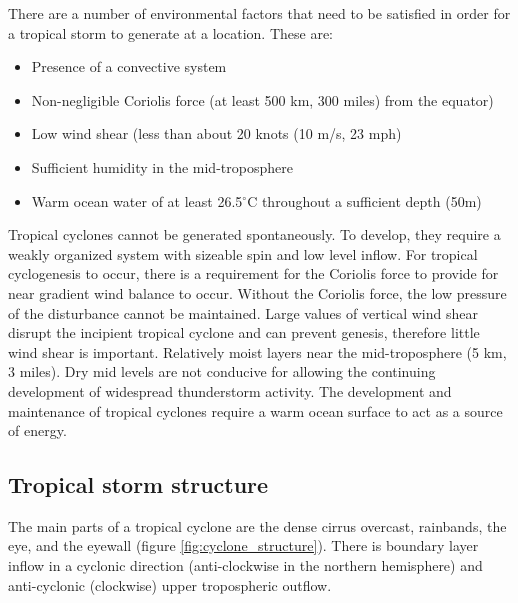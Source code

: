 There are a number of environmental factors that need to be satisfied in order for a tropical storm to generate at a location. These are:
\begin{itemize}
	\item Presence of a convective system
	\item Non-negligible Coriolis force (at least 500 km, 300 miles) from the equator) \citep{noaaA15}
	\item Low wind shear (less than about 20 knots (10 m/s, 23 mph) \citep{noaaA15} 
	\item Sufficient humidity in the mid-troposphere
	\item Warm ocean water of at least 26.5$^{\circ}$C throughout a sufficient depth (50m)
	
\end{itemize}

Tropical cyclones cannot be generated spontaneously. To develop, they require a weakly organized system with sizeable spin and low level inflow. For tropical cyclogenesis to occur, there is a requirement for the Coriolis force to provide for near gradient wind balance to occur. Without the Coriolis force, the low pressure of the disturbance cannot be maintained. Large values of vertical wind shear disrupt the incipient tropical cyclone and can prevent genesis, therefore little wind shear is important. Relatively moist layers near the mid-troposphere (5 km, 3 miles). Dry mid levels are not conducive for allowing the continuing development of widespread thunderstorm activity. The development and maintenance of tropical cyclones require a warm ocean surface to act as a source of energy.



\subsection{Tropical storm structure}

The main parts of a tropical cyclone are the dense cirrus overcast, rainbands, the eye, and the eyewall (figure \ref{fig:cyclone_structure}). There is boundary layer inflow in a cyclonic direction (anti-clockwise in the northern hemisphere) and anti-cyclonic (clockwise) upper tropospheric outflow.


